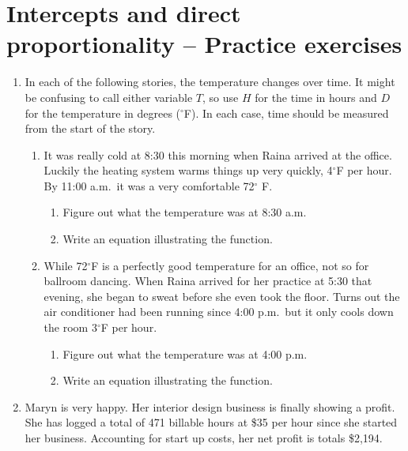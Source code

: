 
\section{Intercepts and direct proportionality -- Practice exercises}

\begin{enumerate}

\item In each of the following stories, the temperature changes over time.  It might be confusing to call either variable $T$, so use $H$ for the time in hours and $D$ for the temperature in degrees ($^{\circ}$F).  In each case, time should be measured from the start of the story.
\begin{enumerate}
\item It was really cold at 8:30 this morning when Raina arrived at the office.  Luckily the heating system warms things up very quickly, 4$^\circ$F per hour.  By 11:00 a.m.\  it was a very comfortable 72$^\circ$ F.
\begin{enumerate}
\item Figure out what the temperature was at 8:30 a.m.  \vfill
\item Write an equation illustrating the function.   \vfill
\end{enumerate}
\item While 72$^\circ$F is a perfectly good temperature for an office, not so for ballroom dancing. When Raina arrived for her practice at 5:30 that evening, she began to sweat before she even took the floor.  Turns out the air conditioner had been running since 4:00 p.m.\ but it only cools down the room 3$^\circ$F per hour.
\begin{enumerate}
\item Figure out what the temperature was at 4:00 p.m.   \vfill
\item Write an equation illustrating the function.   \vfill
\end{enumerate} 
\end{enumerate}

\newpage %

\item Maryn is very happy.  Her interior design business is finally showing a profit.  She has logged a total of 471 billable hours at \$35 per hour since she started her business.  Accounting for start up costs, her net profit is totals  \$2,194.


\end{enumerate}
